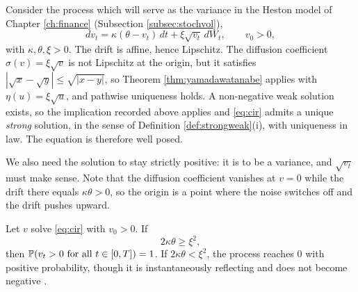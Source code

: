 \begin{example}\label{example:cirwellposed}
Consider the process which will serve as the variance in the Heston model of Chapter
\ref{ch:finance} (Subsection \ref{subsec:stochvol}),
\begin{equation}\label{eq:cir}
dv_t = \kappa(\theta - v_t)\,dt + \xi\sqrt{v_t}\,dW_t, \qquad v_0 > 0,
\end{equation}
with $\kappa,\theta,\xi>0$. The drift is affine, hence Lipschitz. The diffusion coefficient 
$\sigma(v)=\xi\sqrt{v}$ is not Lipschitz at the origin, but it satisfies 
$|\sqrt{x}-\sqrt{y}| \leq \sqrt{|x-y|}$, so Theorem \ref{thm:yamadawatanabe} applies with
$\eta(u)=\xi\sqrt{u}$, and pathwise uniqueness holds. A non-negative weak solution exists, so the
implication recorded above applies and \eqref{eq:cir} admits a unique \emph{strong} solution, in the
sense of Definition \ref{def:strongweak}(i), with uniqueness in law. The equation is therefore well
posed.
\end{example}

We also need the solution to 
stay strictly positive: it is to be a variance, and $\sqrt{v_t}$ must make sense. Note that the 
diffusion coefficient vanishes at $v=0$ while the drift there equals $\kappa\theta > 0$, so the 
origin is a point where the noise switches off and the drift pushes upward.

\begin{proposition}\label{prop:feller}
Let $v$ solve \eqref{eq:cir} with $v_0>0$. If
\begin{equation}\label{eq:fellercondition}
2\kappa\theta \geq \xi^2,
\end{equation}
then $\mathbb{P}(v_t > 0 \text{ for all } t \in [0,T]) = 1$. If $2\kappa\theta < \xi^2$, the process 
reaches $0$ with positive probability, though it is instantaneously reflecting and does not become 
negative \cite{feller1951}. \qedopentext
\end{proposition}


